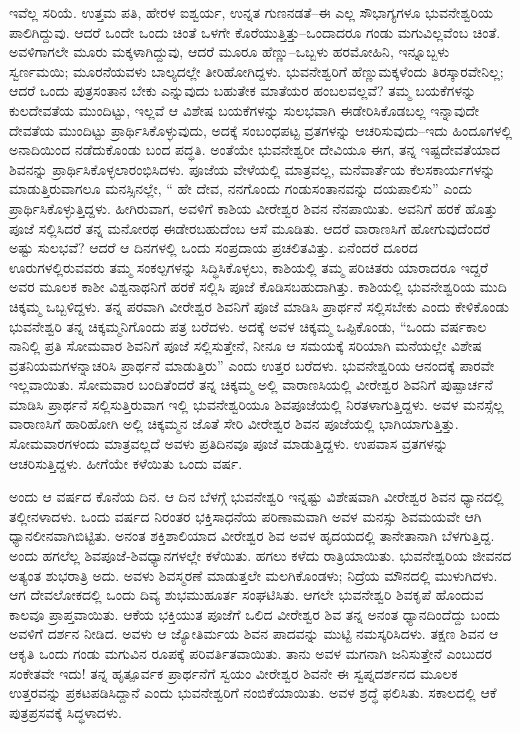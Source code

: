 ಇವೆಲ್ಲ ಸರಿಯೆ. ಉತ್ತಮ ಪತಿ, ಹೇರಳ ಐಶ್ವರ್ಯ, ಉನ್ನತ ಗುಣನಡತೆ–ಈ ಎಲ್ಲ ಸೌಭಾಗ್ಯಗಳೂ ಭುವನೇಶ್ವರಿಯ ಪಾಲಿಗಿದ್ದುವು. ಆದರೆ ಒಂದೇ ಒಂದು ಚಿಂತೆ ಒಳಗೇ ಕೊರೆಯುತ್ತಿತ್ತು–ಒಂದಾದರೂ ಗಂಡು ಮಗುವಿಲ್ಲವೆಂಬ ಚಿಂತೆ. ಅವಳಿಗಾಗಲೇ ಮೂರು ಮಕ್ಕಳಾಗಿದ್ದುವು, ಆದರೆ ಮೂರೂ ಹೆಣ್ಣು–ಒಬ್ಬಳು ಹರಮೋಹಿನಿ, ಇನ್ನೂಬ್ಬಳು ಸ್ವರ್ಣಮಯಿ; ಮೂರನೆಯವಳು ಬಾಲ್ಯದಲ್ಲೇ ತೀರಿಹೋಗಿದ್ದಳು. ಭುವನೇಶ್ವರಿಗೆ ಹೆಣ್ಣುಮಕ್ಕಳೆಂದು ತಿರಸ್ಕಾರವೇನಿಲ್ಲ; ಆದರೆ ಒಂದು ಪುತ್ರಸಂತಾನ ಬೇಕು ಎನ್ನುವುದು ಬಹುತೇಕ ಮಾತೆಯರ ಹಂಬಲವಲ್ಲವೆ? ತಮ್ಮ ಬಯಕೆಗಳನ್ನು ಕುಲದೇವತೆಯ ಮುಂದಿಟ್ಟು, ಇಲ್ಲವೆ ಆ ವಿಶೇಷ ಬಯಕೆಗಳನ್ನು ಸುಲಭವಾಗಿ ಈಡೇರಿಸಿಕೊಡಬಲ್ಲ ಇನ್ನಾವುದೇ ದೇವತೆಯ ಮುಂದಿಟ್ಟು ಪ್ರಾರ್ಥಿಸಿಕೊಳ್ಳುವುದು, ಅದಕ್ಕೆ ಸಂಬಂಧಪಟ್ಟ ವ್ರತಗಳನ್ನು ಆಚರಿಸುವುದು–ಇದು ಹಿಂದೂಗಳಲ್ಲಿ ಅನಾದಿಯಿಂದ ನಡೆದುಕೊಂಡು ಬಂದ ಪದ್ಧತಿ. ಅಂತೆಯೇ ಭುವನೇಶ್ವರೀ ದೇವಿಯೂ ಈಗ, ತನ್ನ ಇಷ್ಟದೇವತೆಯಾದ ಶಿವನನ್ನು ಪ್ರಾರ್ಥಿಸಿಕೊಳ್ಳಲಾರಂಭಿಸಿದಳು. ಪೂಜೆಯ ವೇಳೆಯಲ್ಲಿ ಮಾತ್ರವಲ್ಲ, ಮನೆವಾರ್ತೆಯ ಕೆಲಸಕಾರ್ಯಗಳನ್ನು ಮಾಡುತ್ತಿರುವಾಗಲೂ ಮನಸ್ಸಿನಲ್ಲೇ, “ ಹೇ ದೇವ, ನನಗೊಂದು ಗಂಡುಸಂತಾನವನ್ನು ದಯಪಾಲಿಸು” ಎಂದು ಪ್ರಾರ್ಥಿಸಿಕೊಳ್ಳುತ್ತಿದ್ದಳು. ಹೀಗಿರುವಾಗ, ಅವಳಿಗೆ ಕಾಶಿಯ ವೀರೇಶ್ವರ ಶಿವನ ನೆನಪಾಯಿತು. ಅವನಿಗೆ ಹರಕೆ ಹೊತ್ತು ಪೂಜೆ ಸಲ್ಲಿಸಿದರೆ ತನ್ನ ಮನೋರಥ ಈಡೇರಬಹುದೆಂಬ ಆಸೆ ಮೂಡಿತು. ಆದರೆ ವಾರಾಣಸಿಗೆ ಹೋಗುವುದೆಂದರೆ ಅಷ್ಟು ಸುಲಭವೆ? ಆದರೆ ಆ ದಿನಗಳಲ್ಲಿ ಒಂದು ಸಂಪ್ರದಾಯ ಪ್ರಚಲಿತವಿತ್ತು. ಏನೆಂದರೆ ದೂರದ ಊರುಗಳಲ್ಲಿರುವವರು ತಮ್ಮ ಸಂಕಲ್ಪಗಳನ್ನು ಸಿದ್ಧಿಸಿಕೊಳ್ಳಲು, ಕಾಶಿಯಲ್ಲಿ ತಮ್ಮ ಪರಿಚಿತರು ಯಾರಾದರೂ ಇದ್ದರೆ ಅವರ ಮೂಲಕ ಕಾಶೀ ವಿಶ್ವನಾಥನಿಗೆ ಹರಕೆ ಸಲ್ಲಿಸಿ ಪೂಜೆ ಕೊಡಿಸಬಹುದಾಗಿತ್ತು. ಕಾಶಿಯಲ್ಲಿ ಭುವನೇಶ್ವರಿಯ ಮುದಿ ಚಿಕ್ಕಮ್ಮ ಒಬ್ಬಳಿದ್ದಳು. ತನ್ನ ಪರವಾಗಿ ವೀರೇಶ್ವರ ಶಿವನಿಗೆ ಪೂಜೆ ಮಾಡಿಸಿ ಪ್ರಾರ್ಥನೆ ಸಲ್ಲಿಸಬೇಕು ಎಂದು ಕೇಳಿಕೊಂಡು ಭುವನೇಶ್ವರಿ ತನ್ನ ಚಿಕ್ಕಮ್ಮನಿಗೊಂದು ಪತ್ರ ಬರೆದಳು. ಅದಕ್ಕೆ ಅವಳ ಚಿಕ್ಕಮ್ಮ ಒಪ್ಪಿಕೊಂಡು, “ಒಂದು ವರ್ಷಕಾಲ ನಾನಿಲ್ಲಿ ಪ್ರತಿ ಸೋಮವಾರ ಶಿವನಿಗೆ ಪೂಜೆ ಸಲ್ಲಿಸುತ್ತೇನೆ, ನೀನೂ ಆ ಸಮಯಕ್ಕೆ ಸರಿಯಾಗಿ ಮನೆಯಲ್ಲೇ ವಿಶೇಷ ವ್ರತನಿಯಮಗಳನ್ನಾಚರಿಸಿ ಪ್ರಾರ್ಥನೆ ಮಾಡುತ್ತಿರು” ಎಂದು ಉತ್ತರ ಬರೆದಳು. ಭುವನೇಶ್ವರಿಯ ಆನಂದಕ್ಕೆ ಪಾರವೇ ಇಲ್ಲವಾಯಿತು. ಸೋಮವಾರ ಬಂದಿತೆಂದರೆ ತನ್ನ ಚಿಕ್ಕಮ್ಮ ಅಲ್ಲಿ ವಾರಾಣಸಿಯಲ್ಲಿ ವೀರೇಶ್ವರ ಶಿವನಿಗೆ ಪುಷ್ಪಾರ್ಚನೆ ಮಾಡಿಸಿ ಪ್ರಾರ್ಥನೆ ಸಲ್ಲಿಸುತ್ತಿರುವಾಗ ಇಲ್ಲಿ ಭುವನೇಶ್ವರಿಯೂ ಶಿವಪೂಜೆಯಲ್ಲಿ ನಿರತಳಾಗುತ್ತಿದ್ದಳು. ಅವಳ ಮನಸ್ಸೆಲ್ಲ ವಾರಾಣಸಿಗೆ ಹಾರಿಹೋಗಿ ಅಲ್ಲಿ ಚಿಕ್ಕಮ್ಮನ ಜೊತೆ ಸೇರಿ ವೀರೇಶ್ವರ ಶಿವನ ಪೂಜೆಯಲ್ಲಿ ಭಾಗಿಯಾಗುತ್ತಿತ್ತು. ಸೋಮವಾರಗಳಂದು ಮಾತ್ರವಲ್ಲದೆ ಅವಳು ಪ್ರತಿದಿನವೂ ಪೂಜೆ ಮಾಡುತ್ತಿದ್ದಳು. ಉಪವಾಸ ವ್ರತಗಳನ್ನು ಆಚರಿಸುತ್ತಿದ್ದಳು. ಹೀಗೆಯೇ ಕಳೆಯಿತು ಒಂದು ವರ್ಷ.

ಅಂದು ಆ ವರ್ಷದ ಕೊನೆಯ ದಿನ. ಆ ದಿನ ಬೆಳಗ್ಗೆ ಭುವನೇಶ್ವರಿ ಇನ್ನಷ್ಟು ವಿಶೇಷವಾಗಿ ವೀರೇಶ್ವರ ಶಿವನ ಧ್ಯಾನದಲ್ಲಿ ತಲ್ಲೀನಳಾದಳು. ಒಂದು ವರ್ಷದ ನಿರಂತರ ಭಕ್ತಿಸಾಧನೆಯ ಪರಿಣಾಮವಾಗಿ ಅವಳ ಮನಸ್ಸು ಶಿವಮಯವೇ ಆಗಿ ಧ್ಯಾನಲೀನವಾಗಿಬಿಟ್ಟಿತು. ಅನಂತ ಶಕ್ತಿಶಾಲಿಯಾದ ವೀರೇಶ್ವರ ಶಿವ ಅವಳ ಹೃದಯದಲ್ಲಿ ತಾನೇತಾನಾಗಿ ಬೆಳಗುತ್ತಿದ್ದ. ಅಂದು ಹಗಲೆಲ್ಲ ಶಿವಪೂಜೆ-ಶಿವಧ್ಯಾನಗಳಲ್ಲೇ ಕಳೆಯಿತು. ಹಗಲು ಕಳೆದು ರಾತ್ರಿಯಾಯಿತು. ಭುವನೇಶ್ವರಿಯ ಜೀವನದ ಅತ್ಯಂತ ಶುಭರಾತ್ರಿ ಅದು. ಅವಳು ಶಿವಸ್ಮರಣೆ ಮಾಡುತ್ತಲೇ ಮಲಗಿಕೊಂಡಳು; ನಿದ್ರೆಯ ಮೌನದಲ್ಲಿ ಮುಳುಗಿದಳು. ಆಗ ದೇವಲೋಕದಲ್ಲಿ ಒಂದು ದಿವ್ಯ ಶುಭಮುಹೂರ್ತ ಸಂಘಟಿಸಿತು. ಆಗಲೇ ಭುವನೇಶ್ವರಿ ಶಿವಕೃಪೆ ಹೊಂದುವ ಕಾಲವೂ ಪ್ರಾಪ್ತವಾಯಿತು. ಆಕೆಯ ಭಕ್ತಿಯುತ ಪೂಜೆಗೆ ಒಲಿದ ವೀರೇಶ್ವರ ಶಿವ ತನ್ನ ಅನಂತ ಧ್ಯಾನದಿಂದೆದ್ದು ಬಂದು ಅವಳಿಗೆ ದರ್ಶನ ನೀಡಿದ. ಅವಳು ಆ ಜ್ಯೋತಿರ್ಮಯ ಶಿವನ ಪಾದವನ್ನು ಮುಟ್ಟಿ ನಮಸ್ಕರಿಸಿದಳು. ತಕ್ಷಣ ಶಿವನ ಆ ಆಕೃತಿ ಒಂದು ಗಂಡು ಮಗುವಿನ ರೂಪಕ್ಕೆ ಪರಿವರ್ತಿತವಾಯಿತು. ತಾನು ಅವಳ ಮಗನಾಗಿ ಜನಿಸುತ್ತೇನೆ ಎಂಬುದರ ಸಂಕೇತವೇ ಇದು! ತನ್ನ ಹೃತ್ಪೂರ್ವಕ ಪ್ರಾರ್ಥನೆಗೆ ಸ್ವಯಂ ವೀರೇಶ್ವರ ಶಿವನೇ ಈ ಸ್ವಪ್ನದರ್ಶನದ ಮೂಲಕ ಉತ್ತರವನ್ನು ಪ್ರಕಟಪಡಿಸಿದ್ದಾನೆ ಎಂದು ಭುವನೇಶ್ವರಿಗೆ ನಂಬಿಕೆಯಾಯಿತು. ಅವಳ ಶ್ರದ್ಧೆ ಫಲಿಸಿತು. ಸಕಾಲದಲ್ಲಿ ಆಕೆ ಪುತ್ರಪ್ರಸವಕ್ಕೆ ಸಿದ್ಧಳಾದಳು.

